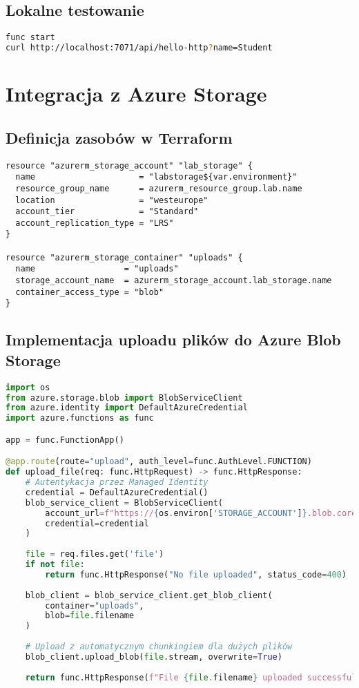 \documentclass{article}
\begin{document}
\subsection{Lokalne testowanie}
\begin{lstlisting}[language=bash]
func start
curl http://localhost:7071/api/hello-http?name=Student
\end{lstlisting}

\section{Integracja z Azure Storage}
\subsection{Definicja zasobów w Terraform}
\begin{lstlisting}[]
resource "azurerm_storage_account" "lab_storage" {
  name                     = "labstorage${var.environment}"
  resource_group_name      = azurerm_resource_group.lab.name
  location                 = "westeurope"
  account_tier             = "Standard"
  account_replication_type = "LRS"
}

resource "azurerm_storage_container" "uploads" {
  name                  = "uploads"
  storage_account_name  = azurerm_storage_account.lab_storage.name
  container_access_type = "blob"
}
\end{lstlisting}

\subsection{Implementacja uploadu plików do Azure Blob Storage}
\begin{lstlisting}[language=python]
import os
from azure.storage.blob import BlobServiceClient
from azure.identity import DefaultAzureCredential
import azure.functions as func

app = func.FunctionApp()

@app.route(route="upload", auth_level=func.AuthLevel.FUNCTION)
def upload_file(req: func.HttpRequest) -> func.HttpResponse:
    # Autentykacja przez Managed Identity
    credential = DefaultAzureCredential()
    blob_service_client = BlobServiceClient(
        account_url=f"https://{os.environ['STORAGE_ACCOUNT']}.blob.core.windows.net",
        credential=credential
    )
    
    file = req.files.get('file')
    if not file:
        return func.HttpResponse("No file uploaded", status_code=400)
    
    blob_client = blob_service_client.get_blob_client(
        container="uploads",
        blob=file.filename
    )
    
    # Upload z automatycznym chunkingiem dla dużych plików
    blob_client.upload_blob(file.stream, overwrite=True)
    
    return func.HttpResponse(f"File {file.filename} uploaded successfully")
\end{lstlisting}
\end{document}
